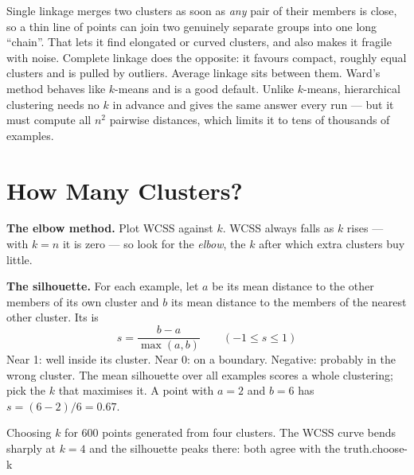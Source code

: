 \begin{conceptbox}
Single linkage merges two clusters as soon as \emph{any} pair of their members is close,
so a thin line of points can join two genuinely separate groups into one long
``chain''. That lets it find elongated or curved clusters, and also makes it fragile
with noise. Complete linkage does the opposite: it favours compact, roughly equal
clusters and is pulled by outliers. Average linkage sits between them. Ward's method
behaves like $k$-means and is a good default. Unlike $k$-means, hierarchical
clustering needs no $k$ in advance and gives the same answer every run --- but it
must compute all $n^2$ pairwise distances, which limits it to tens of thousands of
examples.
\end{conceptbox}

\section{How Many Clusters?}

\textbf{The elbow method.} Plot WCSS against $k$. WCSS always falls as $k$ rises ---
with $k = n$ it is zero --- so look for the \emph{elbow}, the $k$ after which extra
clusters buy little.

\textbf{The silhouette.} For each example, let $a$ be its mean distance to the other
members of its own cluster and $b$ its mean distance to the members of the nearest
other cluster. Its  is
\[
s = \frac{b - a}{\max(a, b)} \qquad (-1 \le s \le 1)
\]
Near 1: well inside its cluster. Near 0: on a boundary. Negative: probably in the
wrong cluster. The mean silhouette over all examples scores a whole clustering; pick
the $k$ that maximises it. A point with $a = 2$ and $b = 6$ has $s = (6 - 2)/6 = 0.67$.

%
{Choosing $k$ for 600 points generated from four clusters. The WCSS curve bends sharply at
$k = 4$ and the silhouette peaks there: both agree with the truth.}{choose-k}

